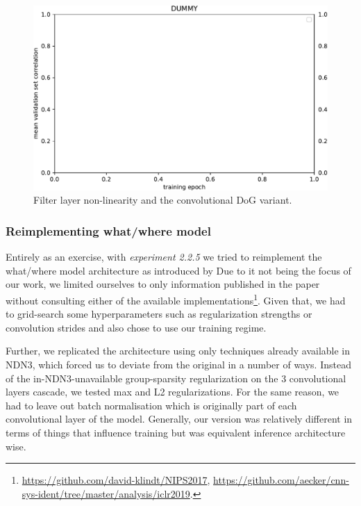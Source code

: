\begin{figure}[H]
    \centering
    \includegraphics[width=1\textwidth]{../figures/05_dummy}
    \caption[Experiment 5.2.2.4]{Filter layer non-linearity and the convolutional DoG variant.}
    \label{fig:5.2.2.4}
\end{figure}

\subsubsection{Reimplementing what/where model}

Entirely as an exercise, with \textit{experiment 2.2.5} we tried to reimplement the what/\-where model architecture as introduced by \cite{klidnt} Due to it not being the focus of our work, we limited ourselves to only information published in the paper without consulting either of the available implementations\footnote{\href{https://github.com/david-klindt/NIPS2017}{https://github.com/david-klindt/NIPS2017}, \href{https://github.com/aecker/cnn-sys-ident/tree/master/analysis/iclr2019}{https://github.com/aecker/cnn-sys-ident/tree/master/analysis/iclr2019}.}. Given that, we had to grid-search some hyperparameters such as regularization strengths or convolution strides and also chose to use our training regime. 

Further, we replicated the architecture using only techniques already available in NDN3, which forced us to deviate from the original in a number of ways. Instead of the in-NDN3-unavailable group-sparsity regularization on the 3 convolutional layers cascade, we tested max and L2 regularizations. For the same reason, we had to leave out batch normalisation which is originally part of each convolutional layer of the model. Generally, our version was relatively different in terms of things that influence training but was equivalent inference architecture wise.

